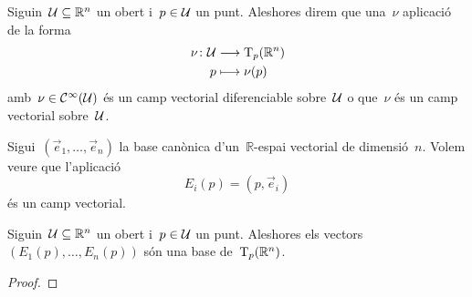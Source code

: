 \documentclass[../../main.tex]{subfiles}
\begin{document}
    \begin{definition}
        \label{def:camp vectorial diferenciable}
        Siguin~\(\mathcal{U}\subseteq\mathbb{R}^{n}\) un obert i~\(p\in\mathcal{U}\) un punt.
        Aleshores direm que una~\(\nu\) aplicació de la forma
        \begin{align*}
            \nu\colon\mathcal{U}&\longrightarrow\operatorname{T}_{p}(\mathbb{R}^{n}) \\
            p&\longmapsto\nu(p)
        \end{align*}
        amb~\(\nu\in\mathcal{C}^{\infty}(\mathcal{U})\) és un camp vectorial diferenciable sobre~\(\mathcal{U}\) o que~\(\nu\) és un camp vectorial sobre~\(\mathcal{U}\).
    \end{definition}
    \begin{example}%
        \label{ex:camp vectorial canònic}
        Sigui~\((\vec{e}_{1},\dots,\vec{e}_{n})\) la base canònica d'un~\(\mathbb{R}\)-espai vectorial de dimensió~\(n\).
        Volem veure que l'aplicació
        \[
            E_{i}(p)=(p,\vec{e}_{i})
        \]
        és un camp vectorial.
        \begin{solution}
        \end{solution}
    \end{example}
    \begin{proposition}
        \label{prop:els camps vectorials canònics són una base de l'espai tangent}
        Siguin~\(\mathcal{U}\subseteq\mathbb{R}^{n}\) un obert i~\(p\in\mathcal{U}\) un punt.
        Aleshores els vectors~\((E_{1}(p),\dots,E_{n}(p))\) són una base de~\(\operatorname{T}_{p}(\mathbb{R}^{n})\).
        \begin{proof}
        \end{proof}
    \end{proposition}
\end{document}
